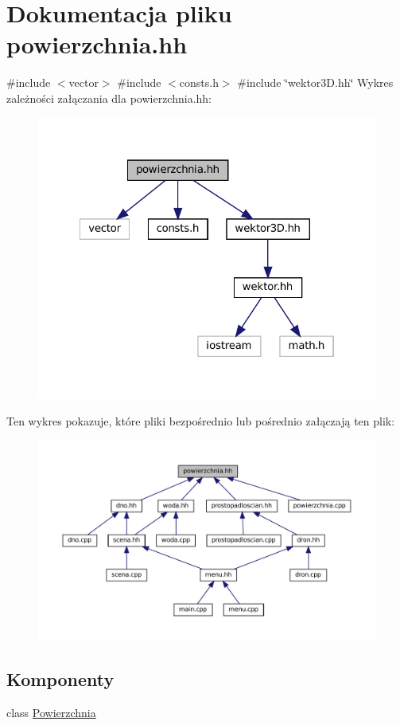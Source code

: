 \hypertarget{powierzchnia_8hh}{}\section{Dokumentacja pliku powierzchnia.\+hh}
\label{powierzchnia_8hh}
{\ttfamily \#include $<$vector$>$}\newline
{\ttfamily \#include $<$consts.\+h$>$}\newline
{\ttfamily \#include \char`\"{}wektor3\+D.\+hh\char`\"{}}\newline
Wykres zależności załączania dla powierzchnia.\+hh\+:\nopagebreak
\begin{figure}[H]
\begin{center}
\leavevmode
\includegraphics[width=322pt]{powierzchnia_8hh__incl}
\end{center}
\end{figure}
Ten wykres pokazuje, które pliki bezpośrednio lub pośrednio załączają ten plik\+:
\nopagebreak
\begin{figure}[H]
\begin{center}
\leavevmode
\includegraphics[width=350pt]{powierzchnia_8hh__dep__incl}
\end{center}
\end{figure}
\subsection*{Komponenty}
\begin{DoxyCompactItemize}
\item 
class \mbox{\hyperlink{class_powierzchnia}{Powierzchnia}}
\end{DoxyCompactItemize}
